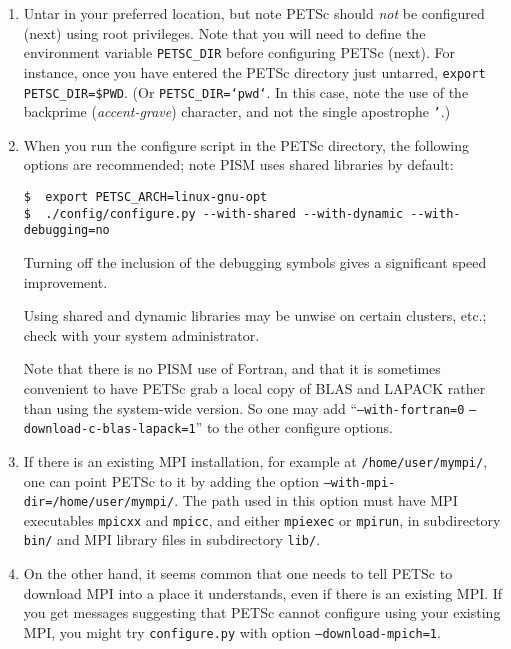 \documentclass[11pt,final]{amsart}
\newcommand{\und}{\_\!\_}
\begin{document}
\begin{enumerate}
\renewcommand{\labelenumii}{(\roman{enumii})}\begin{enumerate}
\item Untar in your preferred location, but note PETSc should \emph{not} be configured (next) using root privileges.  Note that you will need to define the environment variable \texttt{PETSC_DIR}\index{PETSC\und DIR} before configuring PETSc (next).  For instance, once you have entered the PETSc directory just untarred, \texttt{export PETSC_DIR=\$PWD}. (Or \texttt{PETSC_DIR=`pwd`}.  In this case, note the use of the backprime (\emph{accent-grave}) character, and not the single apostrophe \texttt{'}.)

\item When you run the configure script in the PETSc directory, the following options are recommended; note PISM uses shared libraries by default:\index{PETSC\und ARCH}
\begin{verbatim}
$  export PETSC_ARCH=linux-gnu-opt
$  ./config/configure.py --with-shared --with-dynamic --with-debugging=no
\end{verbatim}

Turning off the inclusion of the debugging symbols gives a significant speed improvement.

Using shared and dynamic libraries may be unwise on certain clusters, etc.; check with your system administrator.

Note that there is no PISM use of Fortran, and that it is sometimes convenient to have PETSc grab a local copy of BLAS and LAPACK rather than using the system-wide version.  So one may add ``\texttt{--with-fortran=0} \texttt{--download-c-blas-lapack=1}'' to the other configure options.

\item If there is an existing MPI installation, for example at \texttt{/home/user/mympi/}, one can point PETSc to it by adding the option \texttt{--with-mpi-dir=/home/user/mympi/}.  The path used in this option must have MPI executables \texttt{mpicxx} and \texttt{mpicc}, and either \texttt{mpiexec} or \texttt{mpirun}, in subdirectory \texttt{bin/} and MPI library files in subdirectory \texttt{lib/}.

\item On the other hand, it seems common that one needs to tell PETSc to download MPI into a place it understands, even if there is an existing MPI.  If you get messages suggesting that PETSc cannot configure using your existing MPI, you might try \texttt{configure.py} with option \texttt{--download-mpich=1}.


\end{enumerate}
\end{enumerate}
\end{document}
